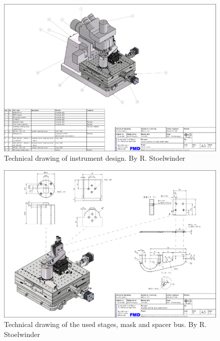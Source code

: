 \documentclass[10pt]{article}
\begin{document}
\label{ap:complete_schematics}
\begin{figure}[tp]
  \centering
  \includegraphics[angle=90,origin=c,width=\textwidth]{img/cad/pag1}
  \caption{Technical drawing of instrument design. By R. Stoelwinder}
  \label{doc:summary_assembly}
\end{figure}

\clearpage
\begin{figure}[htp] 
  \centering
  \includegraphics[angle=90,origin=c,width=\textwidth]{img/cad/pag2.pdf}
  \caption{Technical drawing of the used stages, mask and spacer bus. By R. Stoelwinder}
  \label{doc:tech_stages}
\end{figure}
\end{document}
